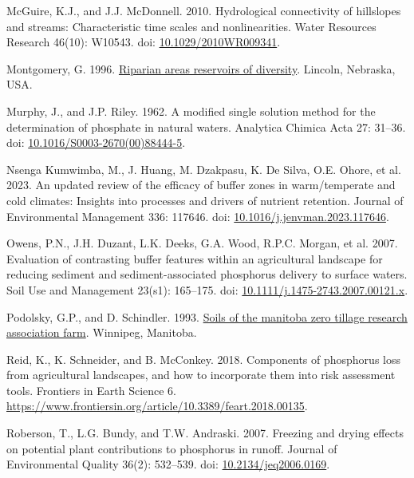 \documentclass[
]{agujournal2019}
\newlength{\cslhangindent}
\newenvironment{CSLReferences}[2] %
 {\begin{list}{}{%
  \setlength{\itemindent}{0pt}
  \setlength{\leftmargin}{0pt}
  \setlength{\parsep}{0pt}
  \ifodd #1
   \setlength{\leftmargin}{\cslhangindent}
   \setlength{\itemindent}{-1\cslhangindent}
  \fi
  \setlength{\itemsep}{#2\baselineskip}}}
 {\end{list}}
\begin{document}
\begin{CSLReferences}{1}{1}
McGuire, K.J., and J.J. McDonnell. 2010. Hydrological connectivity of
hillslopes and streams: Characteristic time scales and nonlinearities.
Water Resources Research 46(10): W10543. doi:
\href{https://doi.org/10.1029/2010WR009341}{10.1029/2010WR009341}.

Montgomery, G. 1996.
\href{https://www.nrcs.usda.gov/wps/portal/nrcs/detail/?cid=nrcs143_014206}{Riparian
areas reservoirs of diversity}. Lincoln, Nebraska, USA.

Murphy, J., and J.P. Riley. 1962. A modified single solution method for
the determination of phosphate in natural waters. Analytica Chimica Acta
27: 31--36. doi:
\href{https://doi.org/10.1016/S0003-2670(00)88444-5}{10.1016/S0003-2670(00)88444-5}.

Nsenga Kumwimba, M., J. Huang, M. Dzakpasu, K. De Silva, O.E. Ohore, et
al. 2023. An updated review of the efficacy of buffer zones in
warm/temperate and cold climates: Insights into processes and drivers of
nutrient retention. Journal of Environmental Management 336: 117646.
doi:
\href{https://doi.org/10.1016/j.jenvman.2023.117646}{10.1016/j.jenvman.2023.117646}.

Owens, P.N., J.H. Duzant, L.K. Deeks, G.A. Wood, R.P.C. Morgan, et al.
2007. Evaluation of contrasting buffer features within an agricultural
landscape for reducing sediment and sediment-associated phosphorus
delivery to surface waters. Soil Use and Management 23(s1): 165--175.
doi:
\href{https://doi.org/10.1111/j.1475-2743.2007.00121.x}{10.1111/j.1475-2743.2007.00121.x}.

Podolsky, G.P., and D. Schindler. 1993.
\href{https://www.manitoba.ca/agriculture/soil/soil-survey/pubs/fss02s00943.pdf}{Soils
of the manitoba zero tillage research association farm}. Winnipeg,
Manitoba.

Reid, K., K. Schneider, and B. McConkey. 2018. Components of phosphorus
loss from agricultural landscapes, and how to incorporate them into risk
assessment tools. Frontiers in Earth Science 6.
\url{https://www.frontiersin.org/article/10.3389/feart.2018.00135}.

Roberson, T., L.G. Bundy, and T.W. Andraski. 2007. Freezing and drying
effects on potential plant contributions to phosphorus in runoff.
Journal of Environmental Quality 36(2): 532--539. doi:
\href{https://doi.org/10.2134/jeq2006.0169}{10.2134/jeq2006.0169}.


\end{CSLReferences}
\end{document}
